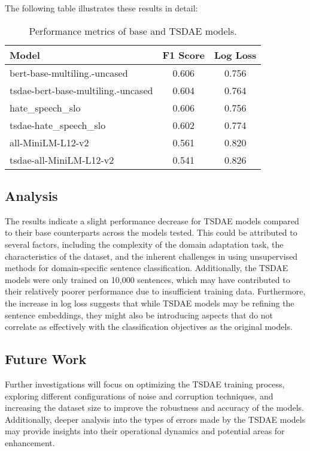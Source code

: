 \documentclass[fleqn,moreauthors,10pt]{ds_report}
\begin{document}
The following table illustrates these results in detail:

\begin{table}[h]
\centering
\begin{tabular}{|l|c|c|}
\hline
\textbf{Model} & \textbf{F1 Score} & \textbf{Log Loss} \\
\hline
bert-base-multiling.-uncased & 0.606 & 0.756 \\
tsdae-bert-base-multiling.-uncased & 0.604 & 0.764 \\
hate\_speech\_slo & 0.606 & 0.756 \\
tsdae-hate\_speech\_slo & 0.602 & 0.774 \\
all-MiniLM-L12-v2 & 0.561 & 0.820 \\
tsdae-all-MiniLM-L12-v2 & 0.541 & 0.826 \\
\hline
\end{tabular}
\caption{Performance metrics of base and TSDAE models.}
\label{table:tsdae_performance}
\end{table}

\subsection*{Analysis}

The results indicate a slight performance decrease for TSDAE models compared to their base counterparts across the models tested. This could be attributed to several factors, including the complexity of the domain adaptation task, the characteristics of the dataset, and the inherent challenges in using unsupervised methods for domain-specific sentence classification. Additionally, the TSDAE models were only trained on 10,000 sentences, which may have contributed to their relatively poorer performance due to insufficient training data. Furthermore, the increase in log loss suggests that while TSDAE models may be refining the sentence embeddings, they might also be introducing aspects that do not correlate as effectively with the classification objectives as the original models.


\subsection*{Future Work}

Further investigations will focus on optimizing the TSDAE training process, exploring different configurations of noise and corruption techniques, and increasing the dataset size to improve the robustness and accuracy of the models. Additionally, deeper analysis into the types of errors made by the TSDAE models may provide insights into their operational dynamics and potential areas for enhancement.
\end{document}
